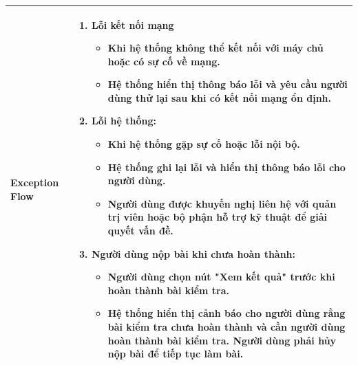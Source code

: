\begin{longtable}[H]{|l|p{}|}
        \textbf{Exception Flow} & \vspace{-0.75cm} \begin{enumerate} [leftmargin=5.5mm]
            \setlength\itemsep{0em}
            \item Lỗi kết nối mạng
                \begin{itemize}
                    \setlength\itemsep{0em}
                    \item Khi hệ thống không thể kết nối với máy chủ hoặc có sự cố về mạng.
                    \item Hệ thống hiển thị thông báo lỗi và yêu cầu người dùng thử lại sau khi có kết nối mạng ổn định.
                \end{itemize}
            \item Lỗi hệ thống:
                \begin{itemize}
                    \setlength\itemsep{0em}
                    \item Khi hệ thống gặp sự cố hoặc lỗi nội bộ.
                    \item Hệ thống ghi lại lỗi và hiển thị thông báo lỗi cho người dùng.
                    \item Người dùng được khuyến nghị liên hệ với quản trị viên hoặc bộ phận hỗ trợ kỹ thuật để giải quyết vấn đề.
                \end{itemize}
            \item Người dùng nộp bài khi chưa hoàn thành:
                \begin{itemize}
                    \setlength\itemsep{0em}
                    \item Người dùng chọn nút "Xem kết quả" trước khi hoàn thành bài kiểm tra.
                    \item  Hệ thống hiển thị cảnh báo cho người dùng rằng bài kiểm tra chưa hoàn thành và cần người dùng hoàn thành bài kiểm tra. Người dùng phải hủy nộp bài để tiếp tục làm bài.
                \end{itemize}
        \end{enumerate}\\
        \hline 
    
    \end{longtable}

